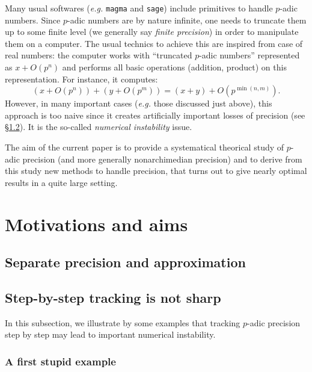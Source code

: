 \documentclass{amsart}
\begin{document}
Many usual softwares (\emph{e.g.} {\tt magma} and {\tt sage}) include 
primitives to handle $p$-adic numbers. Since $p$-adic numbers are by 
nature infinite, one needs to truncate them up to some finite level (we 
generally say \emph{finite precision}) in order to manipulate them on a 
computer. The usual technics to achieve this are inspired from case of 
real numbers: the computer works with ``truncated $p$-adic numbers'' 
represented as $x + O(p^n)$ and performs all basic operations (addition, 
product) on this representation. For instance, it computes: 
$$(x + O(p^n)) + (y + O(p^m)) = (x+y) + O(p^{\min(n,m)}).$$
However, in many important cases (\emph{e.g.} those discussed just 
above), this approach is too naive since it creates artificially 
important losses of precision (see \S\ref{ssec:stepbystep}). 
It is the so-called \emph{numerical instability} issue.

The aim of the current paper is to provide a systematical theorical 
study of $p$-adic precision (and more generally nonarchimedian 
precision) and to derive from this study new methods to handle 
precision, that turns out to give nearly optimal results in a quite 
large setting.

\section{Motivations and aims}


\subsection{Separate precision and approximation}


\subsection{Step-by-step tracking is not sharp}
\label{ssec:stepbystep}

In this subsection, we illustrate by some examples that tracking
$p$-adic precision step by step may lead to important numerical
instability.

\subsubsection*{A first stupid example}
\end{document}
